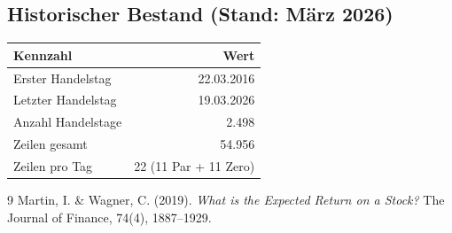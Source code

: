 \documentclass[11pt, a4paper]{article}
\begin{document}
\subsection{Historischer Bestand (Stand: März 2026)}

\begin{tabular}{lr}
  \toprule
  Kennzahl & Wert \\
  \midrule
  Erster Handelstag  & 22.03.2016 \\
  Letzter Handelstag & 19.03.2026 \\
  Anzahl Handelstage & 2.498 \\
  Zeilen gesamt      & 54.956 \\
  Zeilen pro Tag     & 22 (11 Par + 11 Zero) \\
  \bottomrule
\end{tabular}

\begin{thebibliography}{9}
  Martin, I. \& Wagner, C. (2019).
  \textit{What is the Expected Return on a Stock?}
  The Journal of Finance, 74(4), 1887--1929.
\end{thebibliography}
\end{document}

